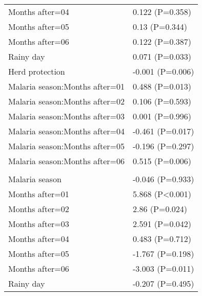 \documentclass[]{article}
\begin{document}
\begin{longtable}[t]{ll}
\hspace{1em}Months after=04 & 0.122 (P=0.358)\\
\hspace{1em}Months after=05 & 0.13 (P=0.344)\\
\hspace{1em}Months after=06 & 0.122 (P=0.387)\\
\hspace{1em}Rainy day & 0.071 (P=0.033)\\
\hspace{1em}Herd protection & -0.001 (P=0.006)\\
\hspace{1em}Malaria season:Months after=01 & 0.488 (P=0.013)\\
\hspace{1em}Malaria season:Months after=02 & 0.106 (P=0.593)\\
\hspace{1em}Malaria season:Months after=03 & 0.001 (P=0.996)\\
\hspace{1em}Malaria season:Months after=04 & -0.461 (P=0.017)\\
\hspace{1em}Malaria season:Months after=05 & -0.196 (P=0.297)\\
\hspace{1em}Malaria season:Months after=06 & 0.515 (P=0.006)\\
\addlinespace[1.5em]
\multicolumn{2}{l}{\textbf{Temporary not field worker}}\\
\hspace{1em}Malaria season & -0.046 (P=0.933)\\
\hspace{1em}Months after=01 & 5.868 (P<0.001)\\
\hspace{1em}Months after=02 & 2.86 (P=0.024)\\
\hspace{1em}Months after=03 & 2.591 (P=0.042)\\
\hspace{1em}Months after=04 & 0.483 (P=0.712)\\
\hspace{1em}Months after=05 & -1.767 (P=0.198)\\
\hspace{1em}Months after=06 & -3.003 (P=0.011)\\
\hspace{1em}Rainy day & -0.207 (P=0.495)\\

\end{longtable}
\end{document}
